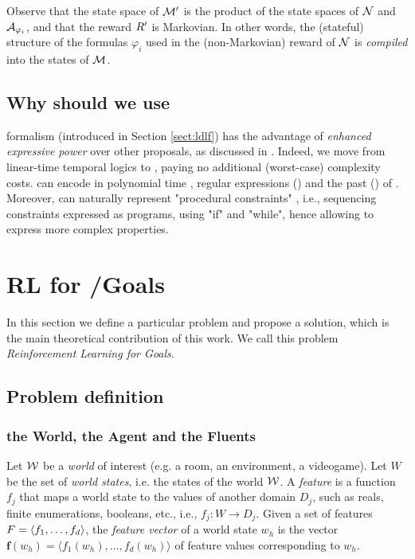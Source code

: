 Observe that the state space of $\mathcal{M}'$ is the product of 
the state spaces of $\mathcal{N}$ and $\mathcal{A}_{\varphi_i}$, and that the reward
$R'$ is Markovian. In other words, the (stateful) structure of
the \LLf formulas $\varphi_i$ used in the 
(non-Markovian) reward of $\mathcal{N}$ is \emph{compiled} into 
the states of $\mathcal{M}$.

\subsection*{Why should we use \LDLf}
\LDLf formalism (introduced in Section \ref{sect:ldlf})  has the advantage of \emph{enhanced expressive power} over other proposals, as discussed in \citep{AAAI1817342}. Indeed, we move from linear-time temporal logics to \LDLf, paying no additional (worst-case) complexity costs. \LDLf can encode in polynomial time \LTLf, regular expressions (\REGEX) and the past \LTL (\PLTL) of \citep{bacchus1996rewarding}.
	Moreover, \LDLf can naturally
	represent "procedural constraints" \citep{Baier:2008:BCP:1620270.1620321}, i.e.,
	sequencing constraints expressed as programs, using "if" and
	"while", hence allowing to express more complex properties.


\section{RL for \LTLf/\LDLf Goals}
\label{sect:rl-for-llf-goals}

In this section we define a particular problem and propose a solution, which is the main theoretical contribution of this work. We call this problem \emph{Reinforcement Learning for \LLf Goals}. 

\subsection{Problem definition}\label{sect:problem-definition}

\subsubsection{the World, the Agent and the Fluents}
Let $\mathcal{W}$ be a \emph{world} of interest (e.g. a room, an environment, a videogame). Let $W$ be the set of \emph{world states}, i.e. the states of the world $\mathcal{W}$. 
A \emph{feature} is a function $f_j$ that maps a world state to the
values of another domain $D_j$, such as reals, finite enumerations,
booleans, etc., i.e., $f_j : W \rightarrow D_j$.
Given a set of features $F = \langle f_1, \dots, f_d \rangle$, the \emph{feature vector} of a world state $w_h$ is the vector
$\mathbf{f}(w_h) = \langle f_1(w_h), \ldots, f_d(w_h) \rangle$ of
feature values corresponding to $w_h$.

